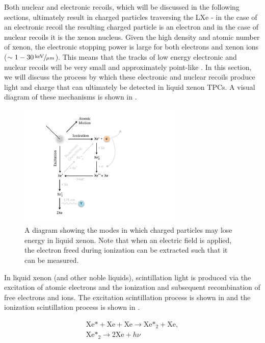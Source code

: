 Both nuclear and electronic recoils, which will be discussed in the following sections, ultimately result in charged particles traversing the LXe - in the case of an electronic recoil the resulting charged particle is an electron and in the case of nuclear recoils it is the xenon nucleus.  Given the high density and atomic number of xenon, the electronic stopping power is large for both electrons and xenon ions ($\sim 1-30 \, \sfrac{\textrm{keV}}{\mu \textrm{m}}$).  This means that the tracks of low energy electronic and nuclear recoils will be very small and approximately point-like \cite{aprile2006simultaneous}.  In this section, we will discuss the process by which these electronic and nuclear recoils produce light and charge that can ultimately be detected in liquid xenon TPCs.  A visual diagram of these mechanisms is shown in .

\begin{figure}[t]
	\centering
	\includegraphics[width=0.7\textwidth]{observables_diagram}
	\caption{A diagram showing the modes in which charged particles may lose energy in liquid xenon.  Note that when an electric field is applied, the electron freed during ionization can be extracted such that it can be measured.}
	\label{fig:diagram_energy_deposition}
\end{figure}


In liquid xenon (and other noble liquids), scintillation light is produced via the excitation of atomic electrons and the ionization and subsequent recombination of free electrons and ions.  The excitation scintillation process is shown in  and the ionization scintillation process is shown in .  




\begin{equation}
        \label{eqn:exciton_production}
        \begin{gathered}
                \textrm{Xe*} + \textrm{Xe} + \textrm{Xe} \rightarrow \textrm{Xe*}_2 + \textrm{Xe}, \\
                \textrm{Xe*}_2 \rightarrow 2\textrm{Xe} + h \nu
        \end{gathered}
\end{equation}


